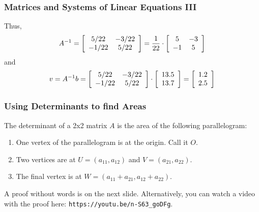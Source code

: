 \documentclass[xcolor=dvipsnames]{beamer}
\begin{document}
\begin{frame}
  \frametitle{Matrices and Systems of Linear Equations III}
Thus,
\begin{equation}
  \label{eq:oogeujie}
  A^{-1}=\left[\begin{array}{cc}
 5/22  & -3/22 \\
 -1/22 & 5/22
               \end{array}\right]=\frac{1}{22}\cdot\left[
               \begin{array}{cc}
                 5 & -3 \\
                 -1 & 5
               \end{array}\right]\notag
\end{equation}
and
\begin{equation}
  \label{eq:seeleeje}
  v=A^{-1}b=\left[\begin{array}{cc}
 5/22  & -3/22 \\
 -1/22 & 5/22
  \end{array}\right]\cdot
\left[\begin{array}{c}
 13.5   \\
 13.7  
  \end{array}\right]=\left[\begin{array}{c}
 1.2   \\
 2.5  
  \end{array}\right]\notag
\end{equation}
\end{frame}

\begin{frame}
  \frametitle{Using Determinants to find Areas}
  The determinant of a 2x2 matrix $A$ is the area of the following
  parallelogram:
  \begin{enumerate}
  \item One vertex of the parallelogram is at the origin. Call it $O$.
  \item Two vertices are at $U=(a_{11},a_{12})$ and
    $V=(a_{21},a_{22})$.
  \item The final vertex is at $W=(a_{11}+a_{21},a_{12}+a_{22})$.
  \end{enumerate}
  A proof without words is on the next slide. Alternatively, you can
  watch a video with the proof here:
  \texttt{https://youtu.be/n-S63\_goDFg}.
\end{frame}
\end{document}
